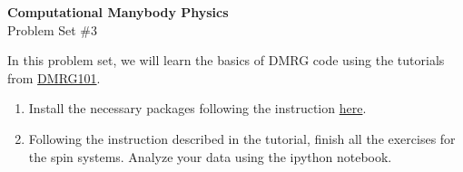 \documentclass[12pt]{article}
\begin{document}
\begin{center}
\Large
\textbf{Computational Manybody Physics}\\
\large
Problem Set \#3\\


\end{center}

In this problem set, we will learn the basics of DMRG code using the tutorials from
 \href{http://dmrg101_tutorial.readthedocs.org/en/latest/index.html}{DMRG101}.
\begin{enumerate}
\item Install the necessary packages following the instruction  \href{https://sites.google.com/site/dmrg101/tutorial}{here}.
\item Following the instruction described in the tutorial, finish all the exercises for the spin systems. Analyze your data using the ipython notebook.
\end{enumerate}
\end{document}
